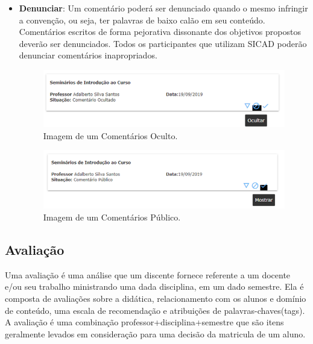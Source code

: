 \documentclass[12pt, a4paper]{report}
\begin{document}
\begin{itemize}
\item \textbf{Denunciar}: Um comentário poderá ser denunciado quando o mesmo infringir a convenção, ou seja, ter palavras de baixo calão em seu conteúdo. Comentários escritos de forma pejorativa dissonante dos objetivos propostos deverão ser denunciados. Todos os participantes que utilizam \ac{SICAD} poderão denunciar comentários inapropriados.

\begin{figure}
\centering
\includegraphics[scale=0.7]{comentario_oculto.png}
\caption{Imagem de um Comentários Oculto.}
\label{fig:comentario_oculto}
\end{figure}

\begin{figure}
\centering
\includegraphics[scale=0.7]{comentario_publico.png}
\caption{Imagem de um Comentários Público.}
\label{fig:comentario_publico}
\end{figure}

\end{itemize}
\subsection{Avaliação}

Uma avaliação é uma análise que um discente fornece referente a um docente e/ou seu trabalho ministrando uma dada disciplina, em um dado semestre. Ela é composta de avaliações sobre a didática, relacionamento com os alunos e domínio de conteúdo, uma escala de recomendação e atribuições de palavras-chaves(tags). A avaliação é uma combinação professor+disciplina+semestre que são itens geralmente levados em consideração para uma decisão da matricula de um aluno.
\end{document}
